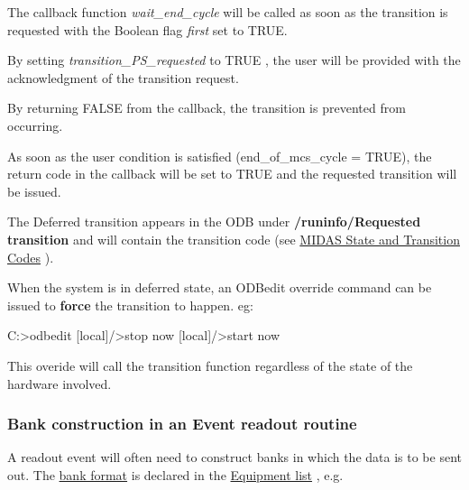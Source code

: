 \begin{DoxyItemize}
\item The callback function {\itshape wait\_\-end\_\-cycle\/} will be called as soon as the transition is requested with the Boolean flag {\itshape first\/} set to TRUE.
\item By setting {\itshape transition\_\-PS\_\-requested\/} to TRUE , the user will be provided with the acknowledgment of the transition request.
\item By returning FALSE from the callback, the transition is prevented from occurring.
\end{DoxyItemize}


\begin{DoxyItemize}
\item As soon as the user condition is satisfied (end\_\-of\_\-mcs\_\-cycle = TRUE), the return code in the callback will be set to TRUE and the requested transition will be issued.
\end{DoxyItemize}

The Deferred transition appears in the ODB under {\bfseries /runinfo/Requested transition} and will contain the transition code (see \hyperlink{RC_Run_States_and_Transitions_RC_state_transition}{MIDAS State and Transition Codes} ).

When the system is in deferred state, an ODBedit override command can be issued to {\bfseries force} the transition to happen. eg: 
\begin{DoxyCode}
C:\online>odbedit
 [local]/>stop now 
 [local]/>start now
\end{DoxyCode}


This overide will call the transition function regardless of the state of the hardware involved.

\par
 

\par


\label{index_end}
\hypertarget{index_end}{}
 \subsubsection{Bank construction in an Event readout routine}\label{FE_bank_construction}
\label{FE_bank_construction_idx_bank_construction}
\hypertarget{FE_bank_construction_idx_bank_construction}{}
 \par
 

\par


A readout event will often need to construct banks in which the data is to be sent out. The \hyperlink{FE_table_FE_tbl_Format}{bank format} is declared in the \hyperlink{FE_eqdec_FE_Example_equipment_structure}{Equipment list} , e.g. 
\begin{DoxyCode}
    EQUIPMENT equipment[] = {

      { "Trigger",            // equipment name
        {
          ...
          "Midas",            // format
          ...
      ...  
\end{DoxyCode}


